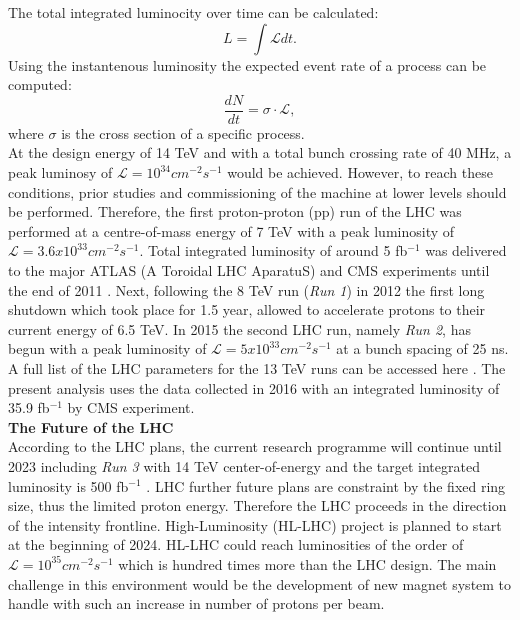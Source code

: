 The total integrated luminocity over time can be calculated:
\begin{equation}
  \label{eqn:Lum}
  L = \int \mathcal{L} dt.
\end{equation}
Using the instantenous luminosity the expected event rate of a process can be computed:
\begin{equation}
  \label{eqn:Eventrate}
  \frac{dN}{dt} = \sigma \cdot \mathcal{L},
\end{equation}
where $\sigma$ is the cross section of a specific process.\\
At the design energy of 14 TeV and with a total bunch crossing rate of 40 MHz, a peak luminosy of $\mathcal{L}=10^{34}cm^{-2}s^{-1}$ would be achieved. However, to reach these conditions, prior studies and commissioning of the machine at lower levels should be performed. Therefore, the first proton-proton (pp) run of the LHC was performed at a centre-of-mass energy of 7 TeV with a peak luminosity of $\mathcal{L}=3.6 x 10^{33}cm^{-2}s^{-1}$. Total integrated luminosity of around 5 fb$^{-1}$ was delivered to the major ATLAS (A Toroidal LHC AparatuS) and CMS experiments until the end of 2011 \cite{lumi5}.
Next, following the 8 TeV run ({\it Run 1}) in 2012 the first long shutdown which took place for 1.5 year, allowed to accelerate protons to their current energy of 6.5 TeV. In 2015 the second LHC run, namely {\it Run 2}, has begun with a peak luminosity of $\mathcal{L}=5 x 10^{33}cm^{-2}s^{-1}$ at a bunch spacing of 25 ns.
A full list of the LHC parameters for the 13 TeV runs can be accessed here \cite{LHC_param}. The present analysis uses the data collected in 2016 with an integrated luminosity of 35.9 fb$^{-1}$ by CMS experiment.
\\
\textbf{The Future of the LHC}\\
According to the LHC plans, the current research programme will continue until 2023 including {\it Run 3} with 14 TeV center-of-energy and the target integrated luminosity is 500 fb$^{-1}$ \cite{LHC_time}.
LHC further future plans are constraint by the fixed ring size, thus the limited proton energy.  Therefore the LHC proceeds in the direction of the intensity frontline. High-Luminosity (HL-LHC) project is planned to start at the beginning of 2024. HL-LHC could reach luminosities of the order of $\mathcal{L}=10^{35}cm^{-2}s^{-1}$ which is hundred times more than the LHC design. The main challenge in this environment would be the development of new magnet system to handle with such an increase in number of protons per beam.
\newpage
